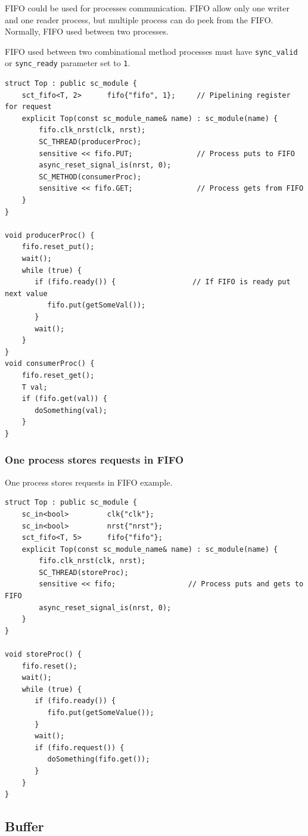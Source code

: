 FIFO could be used for processes communication. FIFO allow only one writer and one reader process, but multiple process can do peek from the FIFO. Normally, FIFO used between two processes.

FIFO used between two combinational method processes must have {\tt sync\_valid} or {\tt sync\_ready} parameter set to {\tt 1}.

\begin{lstlisting}[style=mycpp]
struct Top : public sc_module {
    sct_fifo<T, 2>      fifo{"fifo", 1};     // Pipelining register for request
    explicit Top(const sc_module_name& name) : sc_module(name) {
        fifo.clk_nrst(clk, nrst);
        SC_THREAD(producerProc); 
        sensitive << fifo.PUT;               // Process puts to FIFO
        async_reset_signal_is(nrst, 0);
        SC_METHOD(consumerProc); 
        sensitive << fifo.GET;               // Process gets from FIFO   
    } 
}

void producerProc() {
    fifo.reset_put();
    wait();
    while (true) {
       if (fifo.ready()) {                  // If FIFO is ready put next value
          fifo.put(getSomeVal());
       }
       wait();
    }
}
void consumerProc() {
    fifo.reset_get();
    T val;
    if (fifo.get(val)) {
       doSomething(val);
    }
}
\end{lstlisting}

\subsubsection{One process stores requests in FIFO}

One process stores requests in FIFO example.
\begin{lstlisting}[style=mycpp]
struct Top : public sc_module {
    sc_in<bool>         clk{"clk"};
    sc_in<bool>         nrst{"nrst"};
    sct_fifo<T, 5>      fifo{"fifo"};
    explicit Top(const sc_module_name& name) : sc_module(name) {
        fifo.clk_nrst(clk, nrst);
        SC_THREAD(storeProc); 
        sensitive << fifo;                 // Process puts and gets to FIFO
        async_reset_signal_is(nrst, 0);
    }
}

void storeProc() {
    fifo.reset();
    wait();
    while (true) {
       if (fifo.ready()) {
          fifo.put(getSomeValue());
       }
       wait(); 
       if (fifo.request()) {
          doSomething(fifo.get());
       }
    }
}
\end{lstlisting}


\subsection{Buffer}

